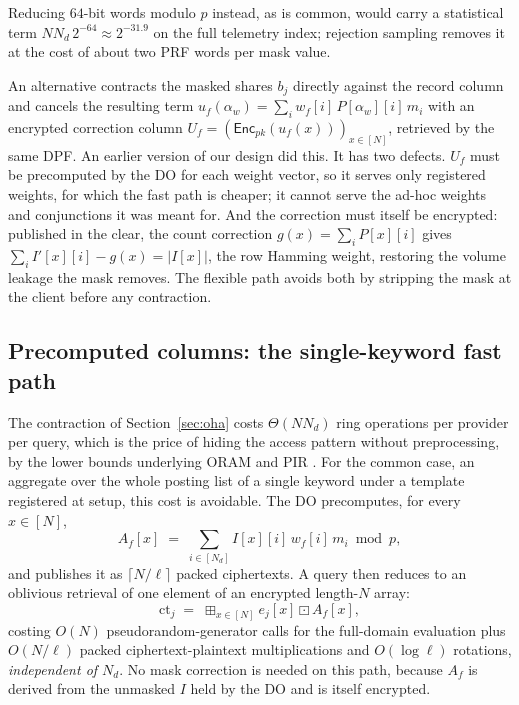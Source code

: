 \documentclass[a4paper,fleqn]{cas-sc}
\newif\ifauthorchecks
\newcommand{\authorcheck}[1]{\ifauthorchecks{\color{red}\textsf{[Authors: #1]}}\fi}
\newcommand{\Enc}{\mathsf{Enc}}
\newcommand{\bplus}{\boxplus}
\newcommand{\bdot}{\boxdot}
\begin{document}
Reducing $64$-bit words modulo $p$ instead, as is common, would carry a
statistical term $N N_d\,2^{-64}\approx2^{-31.9}$ on the full
telemetry index; rejection sampling removes it at the cost of about two PRF
words per mask value. \authorcheck{The C++ prototype still reduces 64-bit
words; port the rejection sampler of the reference implementation
(crshe/prg.py) before re-running Section~\ref{sec:leakeval}.}

\begin{remark}
\label{rem:whyenc}
An alternative contracts the masked shares $b_j$ directly against the record
column and cancels the resulting term
$u_f(\alpha_w)=\sum_i w_f[i]\,P[\alpha_w][i]\,m_i$ with an encrypted correction
column $U_f=(\Enc_{pk}(u_f(x)))_{x\in[N]}$, retrieved by the same DPF. An
earlier version of our design did this. It has two defects. $U_f$ must be precomputed by
the DO for each weight vector, so it serves only registered weights, for which
the fast path is cheaper; it cannot serve the ad-hoc weights and conjunctions
it was meant for. And the correction must itself be encrypted: published in the
clear, the count correction $g(x)=\sum_iP[x][i]$ gives
$\sum_iI'[x][i]-g(x)=|I[x]|$, the row Hamming weight, restoring the volume
leakage the mask removes. The flexible path avoids both by stripping the mask
at the client before any contraction.
\end{remark}

\subsection{Precomputed columns: the single-keyword fast path}
\label{sec:fast}
The contraction of Section~\ref{sec:oha} costs $\Theta(N N_d)$ ring operations
per provider per query, which is the price of hiding the access pattern
without preprocessing, by the lower bounds underlying ORAM and PIR
\citep{goldreich1996software,beimel2000reducing}. For the common case, an
aggregate over the whole posting list of a single keyword under a template
registered at setup, this cost is avoidable. The DO precomputes, for every
$x\in[N]$,
\[
A_f[x] \;=\; \sum_{i\in[N_d]} I[x][i]\,w_f[i]\,m_i \bmod p ,
\]
and publishes it as $\lceil N/\ell\rceil$ packed ciphertexts. A query then
reduces to an oblivious retrieval of one element of an encrypted length-$N$
array:
\[
\text{ct}_j \;=\; \bplus_{x\in[N]} e_j[x]\bdot A_f[x],
\]
costing $O(N)$ pseudorandom-generator calls for the full-domain evaluation
plus $O(N/\ell)$ packed ciphertext-plaintext multiplications and
$O(\log \ell)$ rotations, \emph{independent of $N_d$}. No mask correction is
needed on this path, because $A_f$ is derived from the unmasked $I$ held by
the DO and is itself encrypted.
\end{document}
